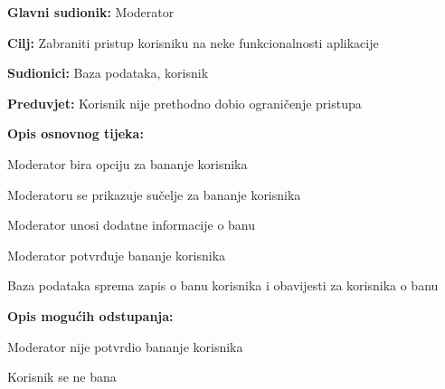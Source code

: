 \noindent {}
\begin{packed_item}

\item \textbf{Glavni sudionik:} Moderator
\item  \textbf{Cilj:} Zabraniti pristup korisniku na neke funkcionalnosti aplikacije
\item  \textbf{Sudionici:} Baza podataka, korisnik
\item  \textbf{Preduvjet:} Korisnik nije prethodno dobio ograničenje pristupa
\item  \textbf{Opis osnovnog tijeka:}

\item[] \begin{packed_enum}

    \item Moderator bira opciju za bananje korisnika
    \item Moderatoru se prikazuje sučelje za bananje korisnika
    \item Moderator unosi dodatne informacije o banu
    \item Moderator potvrđuje bananje korisnika
    \item Baza podataka sprema zapis o banu korisnika i obavijesti za korisnika o banu

\end{packed_enum}

\item  \textbf{Opis mogućih odstupanja:}

\item[] \begin{packed_item}

    \item[4.a] Moderator nije potvrdio bananje korisnika
    \item[] \begin{packed_enum}

        \item Korisnik se ne bana

    \end{packed_enum}

\end{packed_item}
\end{packed_item}

